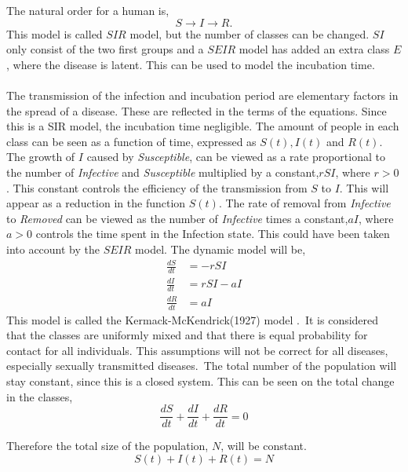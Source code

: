 \documentclass[%
twoside,                 %
final,                   %
10pt]{article}
\begin{document}
\noindent
The natural order for a human is,
\begin{equation}
S \rightarrow I \rightarrow R.
\end{equation}
This model is called $SIR$ model, but the number of classes can be changed. $SI$ only consist of the two first groups and a $SEIR$ model has added an extra class $E$, where the disease is latent. This can be used to model the incubation time. 
\\
\\
The transmission of the infection and incubation period are elementary factors in the spread of a disease. These are reflected in the terms of the equations. Since this is a SIR model, the incubation time negligible. The amount of people in each class can be seen as a function of time, expressed as $S(t),I(t)$ and $R(t)$. The growth of $I$ caused by \emph{Susceptible}, can be viewed as a rate proportional to the number of \emph{Infective} and \emph{Susceptible} multiplied by a constant,$rSI$, where $r>0$. This constant controls the efficiency of the transmission from $S$ to $I$. This will appear as a reduction in the function $S(t)$. The rate of removal from \emph{Infective} to \emph{Removed} can be viewed as the number of \emph{Infective} times a constant,$aI$, where $a>0$ controls the time spent in the Infection state. This could have been taken into account by the $SEIR$ model. The dynamic model will be,
\begin{equation} \label{eq:SIR_model}
	\begin{aligned} 
	\frac{dS}{dt} &= -rSI \\ 
	\frac{dI}{dt} &= rSI-aI \\ 
	\frac{dR}{dt} &= aI 
	\end{aligned}
\end{equation}
This model is called the Kermack-McKendrick(1927) model \cite[p.~320]{murray2002mathematical}.~It is considered that the classes are uniformly mixed and that there is equal probability for contact for all individuals. This assumptions will not be correct for all diseases, especially sexually transmitted diseases. The total number of the population will stay constant, since this is a closed system. This can be seen on the total change in the classes,
\begin{equation}
\frac{dS}{dt} + \frac{dI}{dt} + \frac{dR}{dt} = 0
\end{equation}

Therefore the total size of the population, $N$, will be constant. 
\begin{equation} \label{eq:SIR_N}
S(t)+I(t)+R(t) = N
\end{equation}
\end{document}
